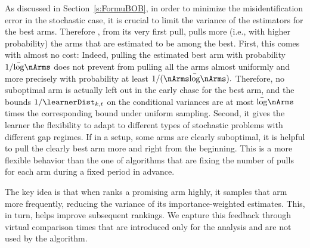As discussed in Section~\ref{s:FormuBOB}, in order to minimize the misidentification error in the stochastic case, it is crucial 
to limit 
the variance of the estimators for the best arms.
Therefore  \Pone{},  from
its very first pull, pulls more (i.e., with higher probability) the arms that are 
estimated to be among the best. 
First, this comes with almost no cost: Indeed, pulling 
the estimated best arm with probability 
$1/\bar\log\nArms$ does not prevent from pulling 
all the arms almost uniformly and more precisely with probability at 
least  $1/(\nArms\bar\log\nArms).$
Therefore, no suboptimal arm is actually left out in 
the early chase for the best arm, and the bounds $1/\learnerDist_{k,t}$
on the conditional variances are at most $\bar\log\nArms$ times
the corresponding bound under uniform sampling.
Second, it gives the learner the flexibility to adapt 
to different types of stochastic problems with 
different gap regimes.   If in a setup,  some arms 
are clearly suboptimal, it is helpful to pull the clearly best 
arm more and right from the beginning. This is a more flexible behavior than the one of algorithms that  are fixing the number of pulls for each arm during a fixed period  in advance. 

The key idea is that when \Pone{} ranks a promising arm
highly, it samples that arm more frequently,
reducing the variance of its importance-weighted
estimates. This, in turn, helps improve subsequent
rankings. We capture this feedback through virtual
comparison times that are introduced only for the
analysis and are not used by the algorithm.

